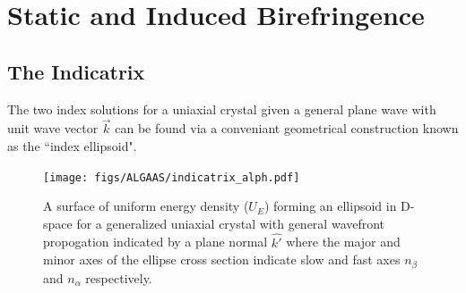 %
%
%
%
\section{Static and Induced Birefringence}
\subsection{The Indicatrix}\label{sec:indicatrix}
The two index solutions for a uniaxial crystal given a general plane wave with unit wave vector $\vec{k}$ can be found via a conveniant geometrical construction known as the ``index ellipsoid". 

\begin{figure}[ht!]
\begin{center}
\texttt{[image: figs/ALGAAS/indicatrix\_alph.pdf]}
\end{center}
\caption{A surface of uniform energy density ($U_E$) forming an ellipsoid in D-space for a generalized uniaxial crystal with general wavefront propogation indicated by a plane normal $\hat{k'}$ where the major and minor axes of the ellipse cross section indicate slow and fast axes $n_\beta$ and $n_\alpha$ respectively.}
\label{fig:genindtrx}
\end{figure}

